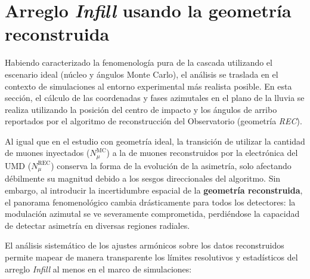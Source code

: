 \section{Arreglo \textit{Infill} usando la geometría reconstruida}
\label{subsec:infill_rec}

Habiendo caracterizado la fenomenología pura de la cascada utilizando el escenario ideal (núcleo y ángulos Monte Carlo), el análisis se traslada en el contexto de simulaciones al entorno experimental más realista posible. En esta sección, el cálculo de las coordenadas y fases azimutales en el plano de la lluvia se realiza utilizando la posición del centro de impacto y los ángulos de arribo reportados por el algoritmo de reconstrucción del Observatorio (geometría \textit{REC}).

Al igual que en el estudio con geometría ideal, la transición de utilizar la cantidad de muones inyectados ($N_\mu^{\mathrm{MC}}$) a la de muones reconstruidos por la electrónica del UMD ($N_\mu^{\mathrm{REC}}$) conserva la forma de la evolución de la asimetría, solo afectando débilmente su magnitud debido a los sesgos direccionales del algoritmo. Sin embargo, al introducir la incertidumbre espacial de la \textbf{geometría reconstruida}, el panorama fenomenológico cambia drásticamente para todos los detectores: la modulación azimutal se ve severamente comprometida, perdiéndose la capacidad de detectar asimetría en diversas regiones radiales.

El análisis sistemático de los ajustes armónicos sobre los datos reconstruidos permite mapear de manera transparente los límites resolutivos y estadísticos del arreglo \textit{Infill} al menos en el marco de simulaciones:


